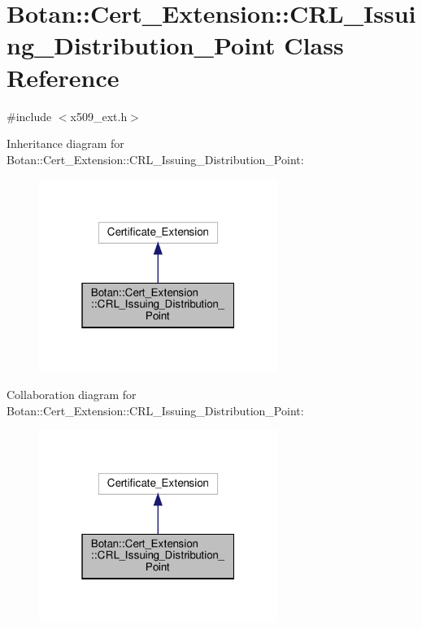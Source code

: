 \hypertarget{class_botan_1_1_cert___extension_1_1_c_r_l___issuing___distribution___point}{}\section{Botan\+:\+:Cert\+\_\+\+Extension\+:\+:C\+R\+L\+\_\+\+Issuing\+\_\+\+Distribution\+\_\+\+Point Class Reference}
\label{class_botan_1_1_cert___extension_1_1_c_r_l___issuing___distribution___point}


{\ttfamily \#include $<$x509\+\_\+ext.\+h$>$}



Inheritance diagram for Botan\+:\+:Cert\+\_\+\+Extension\+:\+:C\+R\+L\+\_\+\+Issuing\+\_\+\+Distribution\+\_\+\+Point\+:
\nopagebreak
\begin{figure}[H]
\begin{center}
\leavevmode
\includegraphics[width=220pt]{class_botan_1_1_cert___extension_1_1_c_r_l___issuing___distribution___point__inherit__graph}
\end{center}
\end{figure}


Collaboration diagram for Botan\+:\+:Cert\+\_\+\+Extension\+:\+:C\+R\+L\+\_\+\+Issuing\+\_\+\+Distribution\+\_\+\+Point\+:
\nopagebreak
\begin{figure}[H]
\begin{center}
\leavevmode
\includegraphics[width=220pt]{class_botan_1_1_cert___extension_1_1_c_r_l___issuing___distribution___point__coll__graph}
\end{center}
\end{figure}
